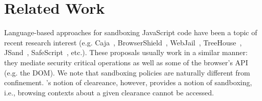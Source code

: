 \section{Related Work}
\label{sec:related}


Language-based approaches for sandboxing 
JavaScript code have been a topic of recent research interest
(e.g. Caja~\cite{GoogleCaja}, BrowserShield~\cite{Reis:2007}, WebJail~\cite{VanAcker:2011}, 
TreeHouse~\cite{Ingram:2012}, JSand~\cite{Agten:2012:JCC}, SafeScript~\cite{SafeScript}, etc.).
These proposals usually work in a similar manner: they mediate security critical
operations as well as some of the browser's API (e.g. the DOM). We note that
sandboxing policies are naturally different from confinement. \sys{}'s notion of
cleareance, however, provides a notion of sandboxing, i.e., browsing
contexts about a given clearance cannot be accessed.

 


